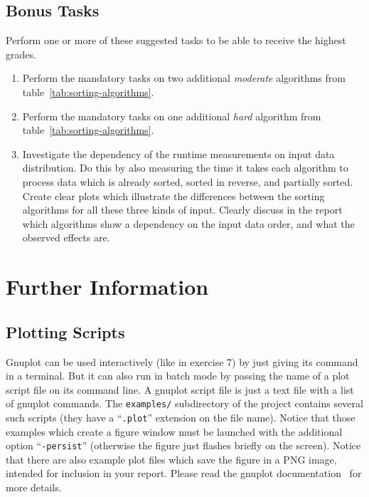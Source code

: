 \documentclass[a4paper,10pt]{article}
\begin{document}
\subsection*{Bonus Tasks}

Perform one or more of these suggested tasks to be able to receive the highest grades.

\begin{enumerate}
  
\item
  Perform the mandatory tasks on two additional \emph{moderate} algorithms from table~\ref{tab:sorting-algorithms}.
  
\item
  Perform the mandatory tasks on one additional \emph{hard} algorithm from table~\ref{tab:sorting-algorithms}.
  
\item
  Investigate the dependency of the runtime measurements on input data distribution.
  Do this by also measuring the time it takes each algorithm to process data which is already sorted, sorted in reverse, and partially sorted.
  Create clear plots which illustrate the differences between the sorting algorithms for all these three kinds of input.
  Clearly discuss in the report which algorithms show a dependency on the input data order, and what the observed effects are.
  
\end{enumerate}



\section*{Further Information}



\subsection*{Plotting Scripts}

Gnuplot can be used interactively (like in exercise 7) by just giving its command in a terminal.
But it can also run in batch mode by passing the name of a plot script file on its command line.
A gnuplot script file is just a text file with a list of gnuplot commands.
The \texttt{examples/} subdirectory of the project contains several such scripts (they have a ``\texttt{.plot}'' extension on the file name).
Notice that those examples which create a figure window must be launched with the additional option ``\texttt{-persist}'' (otherwise the figure just flashes briefly on the screen).
Notice that there are also example plot files which save the figure in a PNG image, intended for inclusion in your report.
Please read the gnuplot documentation~\cite{gnuplot} for more details.
\end{document}
